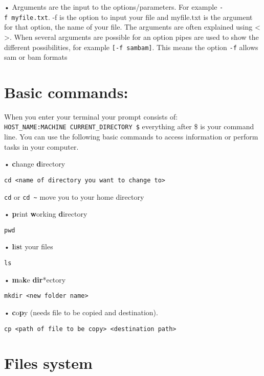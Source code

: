 \documentclass[
]{book}
\begin{document}
• Arguments are the input to the options/parameters. For example \texttt{-f\ myfile.txt}. -f is the option to input your file and myfile.txt is the argument for that option, the name of your file. The arguments are often explained using \textless{} \textgreater. When several arguments are possible for an option pipes are used to show the different possibilities, for example \texttt{{[}-f\ sam\textbar{}bam{]}}. This means the option \texttt{-f} allows sam or bam formats

\hypertarget{basic-commands}{%
\section{Basic commands:}\label{basic-commands}}

When you enter your terminal your prompt consists of: \texttt{HOST\_NAME:MACHINE\ CURRENT\_DIRECTORY\ \$} everything after \$ is your command line. You can use the following basic commands to access information or perform tasks in your computer.

• \textbf{c}hange \textbf{d}irectory

\begin{verbatim}
cd <name of directory you want to change to>
\end{verbatim}

\texttt{cd} or \texttt{cd\ \textasciitilde{}} move you to your home directory

• \textbf{p}rint \textbf{w}orking \textbf{d}irectory

\begin{verbatim}
pwd
\end{verbatim}

• \textbf{l}i\textbf{s}t your files

\begin{verbatim}
ls
\end{verbatim}

• \textbf{m}a\textbf{k}e \textbf{dir}*ectory

\begin{verbatim}
mkdir <new folder name>
\end{verbatim}

• \textbf{c}o\textbf{p}y (needs file to be copied and destination).

\begin{verbatim}
cp <path of file to be copy> <destination path>
\end{verbatim}

\hypertarget{files-system}{%
\section{Files system}\label{files-system}}
\end{document}
